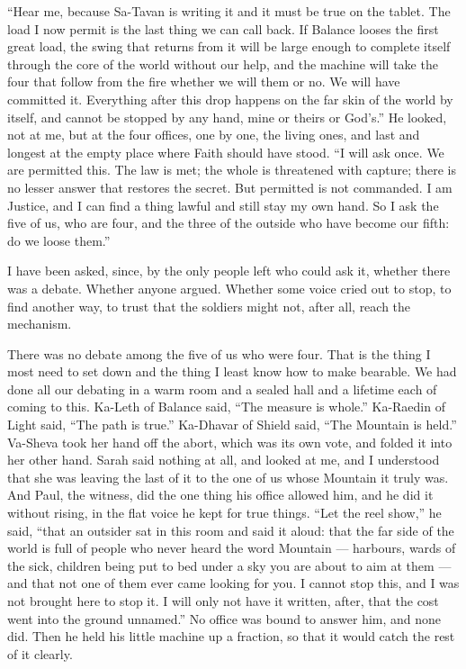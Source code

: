 ``Hear me, because Sa-Tavan is writing it and it must be true on the tablet. The load I now permit is the last thing we can call back. If Balance looses the first great load, the swing that returns from it will be large enough to complete itself through the core of the world without our help, and the machine will take the four that follow from the fire whether we will them or no. We will have committed it. Everything after this drop happens on the far skin of the world by itself, and cannot be stopped by any hand, mine or theirs or God's.'' He looked, not at me, but at the four offices, one by one, the living ones, and last and longest at the empty place where Faith should have stood. ``I will ask once. We are permitted this. The law is met; the whole is threatened with capture; there is no lesser answer that restores the secret. But permitted is not commanded. I am Justice, and I can find a thing lawful and still stay my own hand. So I ask the five of us, who are four, and the three of the outside who have become our fifth: do we loose them.''\par

I have been asked, since, by the only people left who could ask it, whether there was a debate. Whether anyone argued. Whether some voice cried out to stop, to find another way, to trust that the soldiers might not, after all, reach the mechanism.\par

There was no debate among the five of us who were four. That is the thing I most need to set down and the thing I least know how to make bearable. We had done all our debating in a warm room and a sealed hall and a lifetime each of coming to this. Ka-Leth of Balance said, ``The measure is whole.'' Ka-Raedin of Light said, ``The path is true.'' Ka-Dhavar of Shield said, ``The Mountain is held.'' Va-Sheva took her hand off the abort, which was its own vote, and folded it into her other hand. Sarah said nothing at all, and looked at me, and I understood that she was leaving the last of it to the one of us whose Mountain it truly was. And Paul, the witness, did the one thing his office allowed him, and he did it without rising, in the flat voice he kept for true things. ``Let the reel show,'' he said, ``that an outsider sat in this room and said it aloud: that the far side of the world is full of people who never heard the word Mountain --- harbours, wards of the sick, children being put to bed under a sky you are about to aim at them --- and that not one of them ever came looking for you. I cannot stop this, and I was not brought here to stop it. I will only not have it written, after, that the cost went into the ground unnamed.'' No office was bound to answer him, and none did. Then he held his little machine up a fraction, so that it would catch the rest of it clearly.\par

